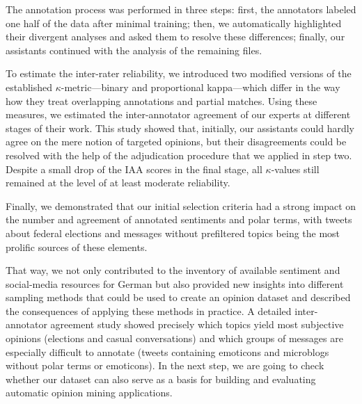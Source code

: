 \documentclass[11pt]{article}
\newcommand{\markable}[1]{\texttt{#1}}
\newcommand{\attribute}[1]{\emph{\texttt{#1}}}
\begin{document}

The annotation process was performed in three steps: first, the
annotators labeled one half of the data after minimal training; then,
we automatically highlighted their divergent analyses and asked them
to resolve these differences; finally, our assistants continued with
the analysis of the remaining files.

To estimate the inter-rater reliability, we introduced two modified
versions of the established $\kappa$-metric---binary and proportional
kappa---which differ in the way how they treat overlapping annotations
and partial matches.  Using these measures, we estimated the
inter-annotator agreement of our experts at different stages of their
work.  This study showed that, initially, our assistants could hardly
agree on the mere notion of targeted opinions, but their disagreements
could be resolved with the help of the adjudication procedure that we
applied in step two.  Despite a small drop of the IAA scores in the
final stage, all $\kappa$-values still remained at the level of at
least moderate reliability.

Finally, we demonstrated that our initial selection criteria had a
strong impact on the number and agreement of annotated sentiments and
polar terms, with tweets about federal elections and messages without
prefiltered topics being the most prolific sources of these elements.

That way, we not only contributed to the inventory of available
sentiment and social-media resources for German but also provided new
insights into different sampling methods that could be used to create
an opinion dataset and described the consequences of applying these
methods in practice.  A detailed inter-annotator agreement study
showed precisely which topics yield most subjective opinions
(elections and casual conversations) and which groups of messages are
especially difficult to annotate (tweets containing emoticons and
microblogs without polar terms or emoticons).  In the next step, we
are going to check whether our dataset can also serve as a basis for
building and evaluating automatic opinion mining applications.
\end{document}
